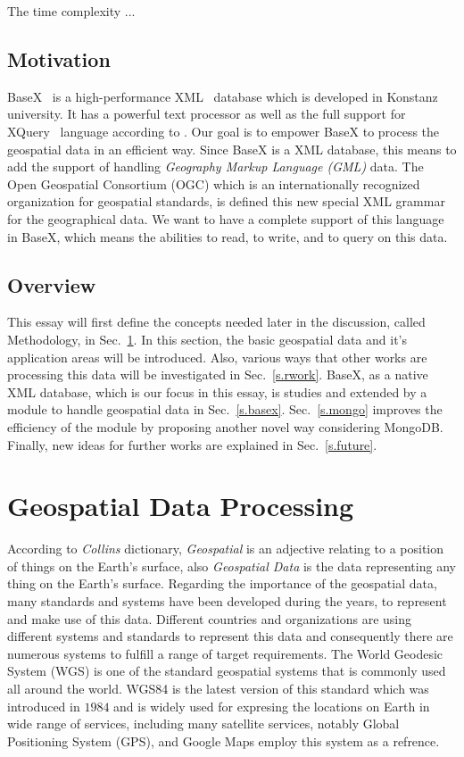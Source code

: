 \documentclass[a4paper,12pt]{article}
\begin{document}
The time complexity ...

\subsection{Motivation}
BaseX~\cite{www/basex} is a high-performance XML~\cite{www/xml}
 database which is developed in Konstanz university.
It has a powerful text processor as well as the full support 
for XQuery~\cite{www/xquery,www/xqueryfun} language according to \cite{conf/xsym/GrunGHS09}.
Our goal is to empower BaseX to process the geospatial data in an efficient way.
Since BaseX is a XML database, this means to add the support of handling 
\emph{Geography Markup Language (GML)} data. The Open Geospatial Consortium (OGC)
which is an internationally recognized organization for geospatial standards,
is defined this new special XML grammar for the geographical data.
We want to have a complete support of this language in BaseX,
which means the abilities to read, to write, and to query on this data.


\subsection{Overview}
This essay will first define the concepts needed later in the discussion, called
Methodology, in Sec.~\ref{s.method}. In this section, the basic geospatial data
and it's application areas will be introduced. Also, various ways that other works
are processing this data will be investigated in Sec.~\ref{s.rwork}. BaseX,
as a native XML database, which is our focus in this essay, is studies and extended
by a module to handle geospatial data in Sec.~\ref{s.basex}. 
Sec.~\ref{s.mongo} improves the efficiency of the module
by proposing another novel way considering MongoDB.
Finally, new ideas for further works are explained in
Sec.~\ref{s.future}.


\newpage
\section{Geospatial Data Processing}
\label{s.method}
According to \emph{Collins} dictionary, \emph{Geospatial} is an adjective relating to a position of things on the Earth's surface, also \emph{Geospatial Data} is the data representing any thing on the Earth's surface. Regarding the importance of the geospatial data, many standards and systems have been developed  during the years, to represent and make use of this data. Different countries and organizations are using different systems and standards to represent this data and consequently there are numerous systems to fulfill a range of target requirements. The World Geodesic System (WGS) is one of the standard geospatial systems that is commonly used all around the world. WGS84 is the latest version of this standard which
was introduced in $1984$ and is widely used for expresing the locations on Earth in wide range of services, including many satellite services, notably Global Positioning System (GPS), and Google Maps employ this system as a refrence.
\end{document}
